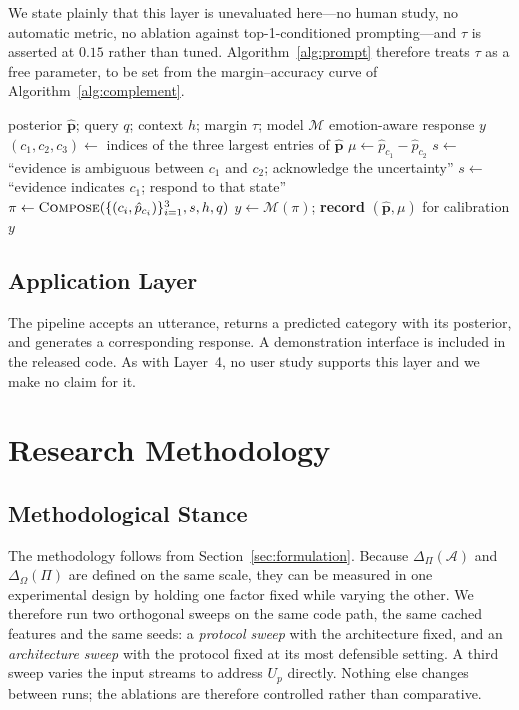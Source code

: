 \documentclass[journal,onecolumn,11pt,draftclsnofoot]{IEEEtran}   %
\begin{document}
We state plainly that this layer is unevaluated here---no human study, no
automatic metric, no ablation against top-1-conditioned prompting---and
$\tau$ is asserted at $0.15$ rather than tuned. Algorithm~\ref{alg:prompt}
therefore treats $\tau$ as a free parameter, to be set from the
margin--accuracy curve of Algorithm~\ref{alg:complement}.

\begin{algorithm}[!t]
\caption{Posterior-conditioned prompt construction}
\label{alg:prompt}
\begin{algorithmic}[1]
\Require posterior $\hat{\mathbf{p}}$; query $q$; context $h$; margin $\tau$;
         model $\mathcal{M}$
\Ensure emotion-aware response $y$
\State $(c_1,c_2,c_3) \gets$ indices of the three largest entries of
       $\hat{\mathbf{p}}$
\State $\mu \gets \hat{p}_{c_1} - \hat{p}_{c_2}$ 
\If{$\mu < \tau$}
  \State $s \gets$ ``evidence is ambiguous between $c_1$ and $c_2$;
         acknowledge the uncertainty''
\Else
  \State $s \gets$ ``evidence indicates $c_1$; respond to that state''
\EndIf
\State $\pi \gets \textsc{Compose}(\{(c_i,\hat{p}_{c_i})\}_{i=1}^{3}, s, h, q)$
\State $y \gets \mathcal{M}(\pi)$; \;
       \textbf{record} $(\hat{\mathbf{p}}, \mu)$ for calibration
\State \Return $y$
\end{algorithmic}
\end{algorithm}

\subsection{Application Layer}
The pipeline accepts an utterance, returns a predicted category with its
posterior, and generates a corresponding response. A demonstration interface is
included in the released code. As with Layer~4, no user study supports this
layer and we make no claim for it.

\section{Research Methodology}
\label{sec:methodology}

\subsection{Methodological Stance}
The methodology follows from Section~\ref{sec:formulation}. Because
$\Delta_\Pi(\mathcal{A})$ and $\Delta_\Omega(\Pi)$ are defined on the same
scale, they can be measured in one experimental design by holding one factor
fixed while varying the other. We therefore run two orthogonal sweeps on the
same code path, the same cached features and the same seeds: a
\emph{protocol sweep} with the architecture fixed, and an \emph{architecture
sweep} with the protocol fixed at its most defensible setting. A third sweep
varies the input streams to address $U_p$ directly. Nothing else changes between
runs; the ablations are therefore controlled rather than comparative.
\end{document}
